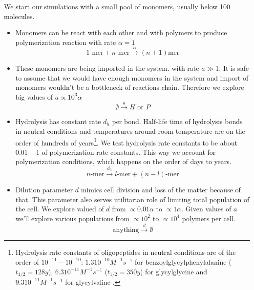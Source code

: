 \documentclass[journal=jacsat,manuscript=article,layout=twocolumn]{achemso}
\newcommand*{\ga}{\alpha}
\begin{document}
We start our simulations with a small pool of monomers, usually below 100 molecules. 
\begin{itemize}
 \item Monomers can be react with each other and with polymers to produce polymerization reaction 
with rate 
$\ga = 1$
\begin{equation}
 1\mbox{-mer}+n\mbox{-mer} \xrightarrow{\ga} (n+1)\mbox{mer}
\end{equation}
\item These monomers are being imported in the system. with rate $a\gg1$. It is safe to assume that 
we would have enough monomers in the system and import of monomers wouldn't be a bottleneck of 
reactions chain. Therefore we explore big values of $a\propto 10^3\ga$
\begin{equation}
 \emptyset \xrightarrow{a} H\,\,\mbox{or}\,\,P
\end{equation}

\item Hydrolysis has constant rate $d_h$ per bond. Half-life time of hydrolysis bonds in neutral 
conditions and temperatures around room temperature are on the order of hundreds of 
years\footnote{Hydrolysis rate constants of oligopeptides in 
neutral conditions are of the order of $10^{-11}-10^{-10}$: $1.3  10^{-10} M^{-1}s^{-1} $ 
for benzoylglycylphenylalanine ($t_{1/2} = 128 y$)\cite{Bryant1996}, $6.3  10^{-11} M^{-1} s^{-1}$
($t_{1/2}=350 y$) for glycylglycine and $9.3 10^{-11}M^{-1} s^{-1}$ for glycylvaline
\cite{Smith1998}.}. We test hydrolysis rate constants to be about $0.01-1$ of polymerization rate 
constants. This way we account for polymerization conditions, which happens on the order of days 
to years.
\begin{equation}
 n\mbox{-mer} \xrightarrow{d_h} l\mbox{-mer}+(n-l)\mbox{-mer}
\end{equation}



\item Dilution parameter $d$ mimics cell division and loss of the matter because of that. 
This parameter also serves utilitarian role of limiting total population of the cell. We explore 
valued of $d$ from $\propto 0.01\ga$ to $\propto 1\ga$. Given values of $a$ we'll explore various 
populations from $\propto 10^2$ to $\propto 10^4$ polymers per 
cell.
\begin{equation}
 \mbox{anything} \xrightarrow{d}\emptyset
\end{equation}



\end{itemize}
\end{document}
